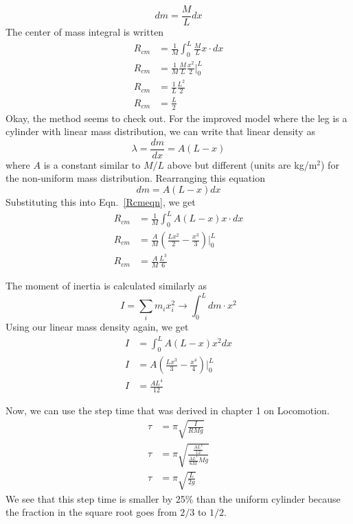 $$dm = \frac{M}{L} dx$$
The center of mass integral is written
\begin{align}
    R_{cm} &= \frac{1}{M}\int_0^L \frac{M}{L}x\cdot dx\nonumber\\
    R_{cm} &= \frac{1}{M}\frac{M}{L}\frac{x^2}{2}\Bigg|_0^L\nonumber\\
    R_{cm} &= \frac{1}{L}\frac{L^2}{2}\nonumber\\
    R_{cm} &= \frac{L}{2}\nonumber
\end{align}
Okay, the method seems to check out. For the improved model where the leg is a cylinder with linear mass distribution, we can write that linear density as
$$\lambda = \frac{dm}{dx} = A\left(L-x\right)$$
where $A$ is a constant similar to $M/L$ above but different (units are kg/m$^2$) for the non-uniform mass distribution. Rearranging this equation
\begin{equation}
   dm = A\left(L-x\right)dx
\end{equation}
Substituting this into Eqn.~\ref{Rcmeqn}, we get
\begin{align}\label{Rcm}
    R_{cm} &= \frac{1}{M}\int_0^L A\left(L-x\right)x\cdot dx\nonumber\\
    R_{cm} &= \frac{A}{M}\left(\frac{Lx^2}{2}-\frac{x^3}{3}\right)\Bigg|_0^L\nonumber\\
    R_{cm} &= \frac{A}{M}\frac{L^3}{6}
\end{align}

The moment of inertia is calculated similarly as
\begin{equation}\label{momInert}
    I = \sum_i m_i x_i^2 \rightarrow \int_0^L dm\cdot x^2
\end{equation}
Using our linear mass density again, we get
\begin{align}\label{momInert2}
    I &= \int_0^L A\left(L-x\right)x^2 dx\nonumber\\
    I &= A\left(\frac{Lx^3}{3}-\frac{x^4}{4}\right)\Bigg|_0^L\nonumber\\
    I &= \frac{AL^4}{12}
\end{align}

Now, we can use the step time that was derived in chapter 1 on Locomotion.
\begin{align}\label{step}
    \tau &= \pi\sqrt{\frac{I}{RMg}}\nonumber\\
    \tau &= \pi\sqrt{\frac{\frac{AL^4}{12}}{\frac{AL^3}{6M}Mg}}\nonumber\\
    \tau &= \pi\sqrt{\frac{L}{2g}}
\end{align}
We see that this step time is smaller by 25\% than the uniform cylinder because the fraction in the square root goes from $2/3$ to $1/2$.


